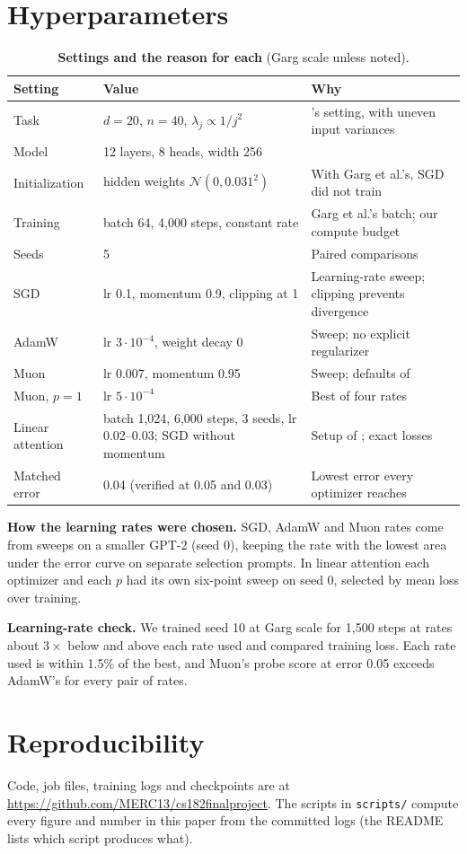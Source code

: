 \documentclass{article}
\begin{document}
\section{Hyperparameters}
\label{app:lr}
\begin{table}[h]
\caption{\textbf{Settings and the reason for each} (Garg scale unless noted).}
\label{tab:hparams}
\vspace{2pt}
\centering\small
\begin{tabular}{@{}p{2.3cm}p{5.0cm}p{5.4cm}@{}}
\toprule
Setting & Value & Why \\
\midrule
Task & $d = 20$, $n = 40$, $\lambda_j \propto 1/j^2$ & \citet{garg2022}'s setting, with uneven input variances \\
Model & 12 layers, 8 heads, width 256 & \citet{garg2022} \\
Initialization & hidden weights $\mathcal{N}(0, 0.031^2)$ & With Garg et al.'s, SGD did not train \\
Training & batch 64, 4,000 steps, constant rate & Garg et al.'s batch; our compute budget \\
Seeds & 5 & Paired comparisons \\
SGD & lr 0.1, momentum 0.9, clipping at 1 & Learning-rate sweep; clipping prevents divergence \\
AdamW & lr $3\cdot10^{-4}$, weight decay 0 & Sweep; no explicit regularizer \\
Muon & lr 0.007, momentum 0.95 & Sweep; defaults of \citet{jordan2024muon} \\
Muon, $p=1$ & lr $5\cdot10^{-4}$ & Best of four rates \\
Linear attention & batch 1,024, 6,000 steps, 3 seeds, lr 0.02--0.03; SGD without momentum & Setup of \citet{zhang2025training}; exact losses \\
Matched error & 0.04 (verified at 0.05 and 0.03) & Lowest error every optimizer reaches \\
\bottomrule
\end{tabular}
\end{table}

\textbf{How the learning rates were chosen.} SGD, AdamW and Muon rates come from sweeps on a smaller GPT-2 (seed 0), keeping the rate with the lowest area under the error curve on separate selection prompts. In linear attention each optimizer and each $p$ had its own six-point sweep on seed 0, selected by mean loss over training.

\textbf{Learning-rate check.} We trained seed 10 at Garg scale for 1,500 steps at rates about $3\times$ below and above each rate used and compared training loss. Each rate used is within 1.5\% of the best, and Muon's probe score at error 0.05 exceeds AdamW's for every pair of rates.

\section{Reproducibility}
\label{app:repro}
Code, job files, training logs and checkpoints are at \url{https://github.com/MERC13/cs182finalproject}. The scripts in \texttt{scripts/} compute every figure and number in this paper from the committed logs (the README lists which script produces what).
\end{document}

